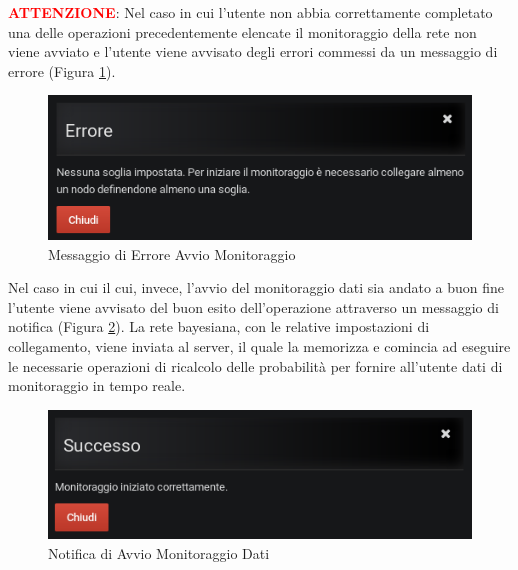 \pagebreak

\textbf{\textcolor{red}{ATTENZIONE}}: Nel caso in cui l'utente non abbia correttamente completato una delle operazioni precedentemente elencate il monitoraggio della rete non viene avviato e l'utente viene avvisato degli errori commessi da un messaggio di errore (Figura \ref{ErroreAvvio}).

\begin{figure}[H]
	\begin{center}
		\includegraphics[scale=0.6]{./images/ErroreAvvio.png}
		 \caption{Messaggio di Errore Avvio Monitoraggio}	
		 \label{ErroreAvvio}
	\end{center}
\end{figure}

Nel caso in cui il cui, invece, l'avvio del monitoraggio dati sia andato a buon fine l'utente viene avvisato del buon esito dell'operazione attraverso un messaggio di notifica (Figura \ref{NotificaMonitoraggio}). La rete bayesiana, con le relative impostazioni di collegamento, viene inviata al server, il quale la memorizza e comincia ad eseguire le necessarie operazioni di ricalcolo delle probabilità per fornire all'utente dati di monitoraggio in tempo reale.

\begin{figure}[H]
	\begin{center}
		\includegraphics[scale=0.6]{./images/NotificaMonitoraggio.png}
		 \caption{Notifica di Avvio Monitoraggio Dati}	
		 \label{NotificaMonitoraggio}
	\end{center}
\end{figure}


